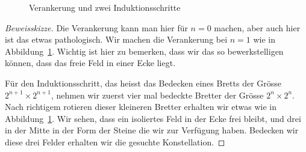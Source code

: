 \documentclass[12pt,a4paper]{article}
\theoremstyle{definition}
\begin{document}
\begin{figure}[htb]
  \centering
  \begin{minipage}{0.33\linewidth}
    \centering
  \end{minipage}%
  \begin{minipage}{0.33\linewidth}
    \centering
  \end{minipage}%
  \begin{minipage}{0.33\linewidth}
    \centering
  \end{minipage}%
  \begin{minipage}{0.5\linewidth}
    \centering
  \end{minipage}
  \caption{Verankerung und zwei Induktionsschritte}%
  \label{fig:induktion}
\end{figure}

\begin{proof}[Beweisskizze]
  Die Verankerung kann man hier für $n = 0$ machen, aber
  auch hier ist das etwas pathologisch. Wir machen die
  Verankerung bei $n = 1$ wie in Abbildung~\ref{fig:induktion}.
  Wichtig ist hier zu bemerken, dass wir das so
  bewerkstelligen können, dass das freie Feld
  in einer Ecke liegt.

  Für den Induktionsschritt, das heisst das Bedecken eines
  Bretts der Grösse $2^{n+1} \times 2^{n+1}$,
  nehmen wir zuerst vier mal bedeckte Bretter der
  Grösse $2^{n} \times 2^{n}$.
  Nach richtigem rotieren dieser
  kleineren Bretter
  erhalten wir etwas
  wie in Abbildung~\ref{fig:induktion}.
  Wir sehen, dass ein isoliertes Feld in der Ecke frei bleibt,
  und drei in der Mitte in der Form der Steine
  die wir zur Verfügung haben.
  Bedecken wir diese drei Felder
  erhalten wir die gesuchte Konstellation.
\end{proof}
\end{document}
